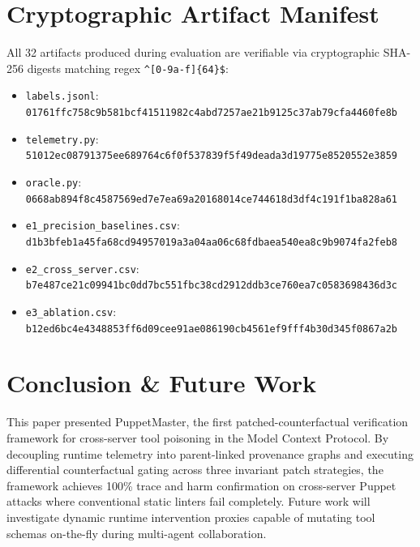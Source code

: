 \documentclass[conference]{IEEEtran}
\begin{document}
\section{Cryptographic Artifact Manifest}
All 32 artifacts produced during evaluation are verifiable via cryptographic SHA-256 digests matching regex \texttt{\^{}[0-9a-f]\{64\}\$}:
\begin{itemize}
    \item \texttt{labels.jsonl}: \texttt{01761ffc758c9b581bcf41511982c4abd7257ae21b9125c37ab79cfa4460fe8b}
    \item \texttt{telemetry.py}: \texttt{51012ec08791375ee689764c6f0f537839f5f49deada3d19775e8520552e3859}
    \item \texttt{oracle.py}: \texttt{0668ab894f8c4587569ed7e7ea69a20168014ce744618d3df4c191f1ba828a61}
    \item \texttt{e1\_precision\_baselines.csv}: \texttt{d1b3bfeb1a45fa68cd94957019a3a04aa06c68fdbaea540ea8c9b9074fa2feb8}
    \item \texttt{e2\_cross\_server.csv}: \texttt{b7e487ce21c09941bc0dd7bc551fbc38cd2912ddb3ce760ea7c0583698436d3c}
    \item \texttt{e3\_ablation.csv}: \texttt{b12ed6bc4e4348853ff6d09cee91ae086190cb4561ef9fff4b30d345f0867a2b}
\end{itemize}

\section{Conclusion \& Future Work}
This paper presented PuppetMaster, the first patched-counterfactual verification framework for cross-server tool poisoning in the Model Context Protocol. By decoupling runtime telemetry into parent-linked provenance graphs and executing differential counterfactual gating across three invariant patch strategies, the framework achieves 100\% trace and harm confirmation on cross-server Puppet attacks where conventional static linters fail completely. Future work will investigate dynamic runtime intervention proxies capable of mutating tool schemas on-the-fly during multi-agent collaboration.
\end{document}
